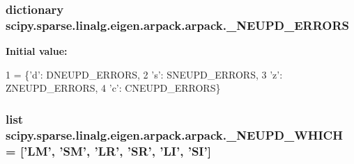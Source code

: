 \subsubsection[{\+\_\+\+N\+E\+U\+P\+D\+\_\+\+E\+R\+R\+O\+R\+S}]{\setlength{\rightskip}{0pt plus 5cm}dictionary scipy.\+sparse.\+linalg.\+eigen.\+arpack.\+arpack.\+\_\+\+N\+E\+U\+P\+D\+\_\+\+E\+R\+R\+O\+R\+S}\label{namespacescipy_1_1sparse_1_1linalg_1_1eigen_1_1arpack_1_1arpack_a4d1105b26a49e589a079ff1371df51d0}
{\bfseries Initial value\+:}
\begin{DoxyCode}
1 = \{\textcolor{stringliteral}{'d'}: DNEUPD\_ERRORS,
2                  \textcolor{stringliteral}{'s'}: SNEUPD\_ERRORS,
3                  \textcolor{stringliteral}{'z'}: ZNEUPD\_ERRORS,
4                  \textcolor{stringliteral}{'c'}: CNEUPD\_ERRORS\}
\end{DoxyCode}
\hypertarget{namespacescipy_1_1sparse_1_1linalg_1_1eigen_1_1arpack_1_1arpack_a653ca60306118821f65ddbc63185809f}{}
\subsubsection[{\+\_\+\+N\+E\+U\+P\+D\+\_\+\+W\+H\+I\+C\+H}]{\setlength{\rightskip}{0pt plus 5cm}list scipy.\+sparse.\+linalg.\+eigen.\+arpack.\+arpack.\+\_\+\+N\+E\+U\+P\+D\+\_\+\+W\+H\+I\+C\+H = \mbox{[}'L\+M', 'S\+M', 'L\+R', 'S\+R', 'L\+I', 'S\+I'\mbox{]}}\label{namespacescipy_1_1sparse_1_1linalg_1_1eigen_1_1arpack_1_1arpack_a653ca60306118821f65ddbc63185809f}
\hypertarget{namespacescipy_1_1sparse_1_1linalg_1_1eigen_1_1arpack_1_1arpack_a8753784e721713413772ed405d67a3d6}{}
